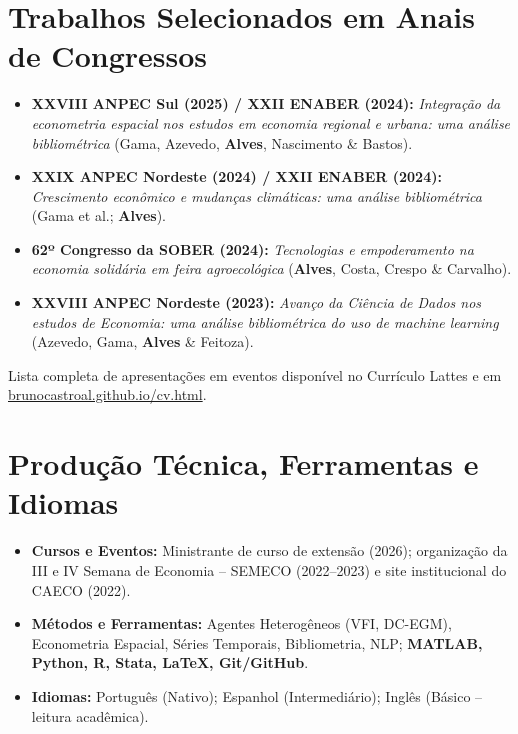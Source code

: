 \documentclass[10pt,a4paper]{article}
\begin{document}
\section{Trabalhos Selecionados em Anais de Congressos}
\begin{itemize}\small
  \item \textbf{XXVIII ANPEC Sul (2025) / XXII ENABER (2024):} \textit{Integração da econometria espacial nos estudos em economia regional e urbana: uma análise bibliométrica} (Gama, Azevedo, \textbf{Alves}, Nascimento \& Bastos).
  \item \textbf{XXIX ANPEC Nordeste (2024) / XXII ENABER (2024):} \textit{Crescimento econômico e mudanças climáticas: uma análise bibliométrica} (Gama et al.; \textbf{Alves}).
  \item \textbf{62º Congresso da SOBER (2024):} \textit{Tecnologias e empoderamento na economia solidária em feira agroecológica} (\textbf{Alves}, Costa, Crespo \& Carvalho).
  \item \textbf{XXVIII ANPEC Nordeste (2023):} \textit{Avanço da Ciência de Dados nos estudos de Economia: uma análise bibliométrica do uso de machine learning} (Azevedo, Gama, \textbf{Alves} \& Feitoza).
\end{itemize}
{\footnotesize \color{muted} Lista completa de apresentações em eventos disponível no Currículo Lattes e em \href{https://brunocastroal.github.io/cv.html}{brunocastroal.github.io/cv.html}.}

\section{Produção Técnica, Ferramentas e Idiomas}
\begin{itemize}\small
  \item \textbf{Cursos e Eventos:} Ministrante de curso de extensão (2026); organização da III e IV Semana de Economia -- SEMECO (2022--2023) e site institucional do CAECO (2022).
  \item \textbf{Métodos e Ferramentas:} Agentes Heterogêneos (VFI, DC-EGM), Econometria Espacial, Séries Temporais, Bibliometria, NLP; \textbf{MATLAB, Python, R, Stata, \LaTeX, Git/GitHub}.
  \item \textbf{Idiomas:} Português (Nativo); Espanhol (Intermediário); Inglês (Básico -- leitura acadêmica).
\end{itemize}
\end{document}
